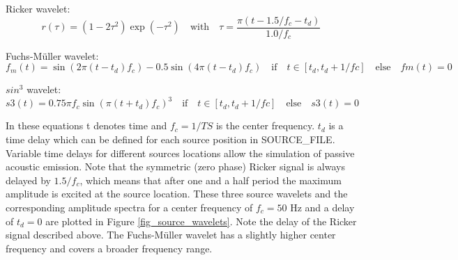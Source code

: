 \documentclass[11pt,onecolumn,oneside]{article}
\begin{document}
Ricker wavelet:
\begin{equation}
r(\tau)=\left(1-2\tau^2\right)\exp(- \tau^2) \quad \mbox{with} \quad \tau=\frac{\pi(t-1.5/f_c-t_d)}{1.0/f_c} 
\label{eq_ricker}
\end{equation}


Fuchs-M\"uller wavelet:
\begin{equation}
f_m(t)=\sin(2\pi(t-t_d)f_c)-0.5\sin(4\pi(t-t_d)f_c) \quad \mbox{if} \quad t\in[t_d,t_d+1/fc] \quad \mbox{else} \quad fm(t)=0
\label{eq_fm}
\end{equation}

$sin^3$ wavelet:
\begin{equation}
s3(t)=0.75 \pi f_c \sin(\pi(t+t_d)f_c)^3\quad \mbox{if} \quad t \in[t_d,t_d+1/fc] \quad \mbox{else} \quad s3(t)=0
\label{eq_s3}
\end{equation}

In these equations t denotes time and $f_c=1/TS$ is the center frequency. $t_d$ is a time delay which can be defined for each source position in SOURCE\_FILE. Variable time delays for different sources locations allow the simulation of passive acoustic emission. Note that the symmetric (zero phase) Ricker signal is always delayed by $1.5/f_c$, which means that after one and a half period the maximum amplitude is excited at the source location. These three source wavelets and the corresponding amplitude spectra for a center frequency of $f_c=50$ Hz and a delay of $t_d=0$ are plotted in Figure \ref{fig_source_wavelets}. Note the delay of the Ricker signal described above. The  Fuchs-M\"uller wavelet has a slightly higher center frequency and covers a broader frequency range.
\end{document}
